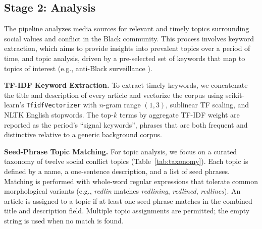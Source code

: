 \documentclass[letterpaper]{article}
\begin{document}
\subsection{Stage 2: Analysis}

The pipeline analyzes media sources for relevant and timely topics
surrounding social values and conflict in the Black community. This
process involves keyword extraction, which aims to provide insights
into prevalent topics over a period of time, and topic analysis, driven
by a pre-selected set of keywords that map to topics of interest (e.g.,
anti-Black surveillance \citep{williams2020}).

\textbf{TF-IDF Keyword Extraction.} To extract timely keywords, we
concatenate the title and description of every article and vectorize
the corpus using scikit-learn's \texttt{TfidfVectorizer} with $n$-gram
range $(1,3)$, sublinear TF scaling, and NLTK English stopwords. The
top-$k$ terms by aggregate TF-IDF weight are reported as the period's
``signal keywords'', phrases that are both frequent and distinctive
relative to a generic background corpus.

\textbf{Seed-Phrase Topic Matching.} For topic analysis, we focus on a
curated taxonomy of twelve social conflict topics (Table~\ref{tab:taxonomy}).
Each topic is defined by a name, a one-sentence description, and a list
of seed phrases. Matching is performed with whole-word regular
expressions that tolerate common morphological variants (e.g.,
\emph{redlin} matches \emph{redlining}, \emph{redlined},
\emph{redlines}). An article is assigned to a topic if at least one seed
phrase matches in the combined title and description field. Multiple
topic assignments are permitted; the empty string is used when no match
is found.
\end{document}
